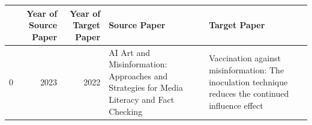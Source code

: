 \begin{tabular}{lrrll}
\toprule
 & Year of Source Paper & Year of Target Paper & Source Paper & Target Paper \\
\midrule
0 & 2023 & 2022 & AI Art and Misinformation: Approaches and Strategies for Media Literacy and Fact Checking & Vaccination against misinformation: The inoculation technique reduces the continued influence effect \\
\bottomrule
\end{tabular}
